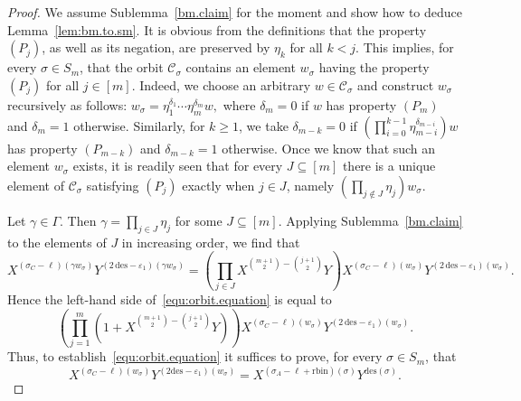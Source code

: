 \documentclass[11pt,a4paper]{amsart}
\theoremstyle{plain}
\theoremstyle{remark}
\begin{document}
\begin{proof}
We assume Sublemma~\ref{bm.claim} for the moment and show how to deduce Lemma~\ref{lem:bm.to.sm}.  It is obvious from the definitions that the property $(P_j)$, as well as its negation, are preserved by $\eta_k$ for all $k < j$.  This implies, for every $\sigma \in S_m$, that the orbit $\mathcal{C}_\sigma$ contains an element $w_\sigma$ having the property $(P_j)$ for all $j \in [m]$.  Indeed, we choose an arbitrary $w \in \mathcal{C}_\sigma$ and construct $w_\sigma$ recursively as follows: 
$w_\sigma = \eta_1^{\delta_1} \cdots \eta_m^{\delta_m} w,$ 
where $\delta_m = 0$ if $w$ has property $(P_m)$ and $\delta_m = 1$ otherwise.  Similarly, for $k \geq 1$, we take $\delta_{m-k} = 0$ if $\left( \prod_{i = 0}^{k-1} \eta_{m-i}^{\delta_{m-i}} \right) w$ has property $(P_{m-k})$ and $\delta_{m-k} = 1$ otherwise.  Once we know that such an element $w_\sigma$ exists, it is readily seen that for every $J \subseteq [m]$ there is a unique element of $\mathcal{C}_\sigma$ satisfying $(P_j)$ exactly when $j \in J$, namely $(\prod_{j \not\in J} \eta_j) w_\sigma$.

Let $\gamma \in \Gamma$.  Then $\gamma = \prod_{j \in J} \eta_j$ for some $J \subseteq [m]$.  Applying Sublemma~\ref{bm.claim} to the elements of $J$ in increasing order, we find that 
\begin{equation} \label{equ:gamma.action.bm}
X^{(\sigma_C - \ell)(\gamma w_\sigma)} Y^{(2 \,\mathrm{des} - \varepsilon_1)(\gamma w_\sigma)} = \left( \prod_{j \in J} X^{\binom{m+1}{2} - \binom{j+1}{2}} Y \right) X^{(\sigma_C - \ell)(w_\sigma)} Y^{(2 \,\mathrm{des} - \varepsilon_1)(w_\sigma)}.
\end{equation}
Hence the left-hand side of~\eqref{equ:orbit.equation} is equal to
\begin{equation*} \label{equ:lhs.bm}
\left( \prod_{j =1}^m ( 1 + X^{\binom{m+1}{2} - \binom{j+1}{2}} Y) \right) X^{(\sigma_C - \ell)(w_\sigma)} Y^{(2 \,\mathrm{des} - \varepsilon_1)(w_\sigma)}.
\end{equation*}
Thus, to establish~\eqref{equ:orbit.equation} it suffices to prove, for every $\sigma \in S_m$, that
\begin{equation} \label{equ:endgame}
X^{(\sigma_C - \ell)(w_\sigma)} Y^{(2 \mathrm{des} - \varepsilon_1)(w_\sigma)} = X^{(\sigma_A - \ell + \mathrm{rbin})(\sigma)} Y^{\mathrm{des}(\sigma)}.
\end{equation}


\end{proof}
\end{document}
